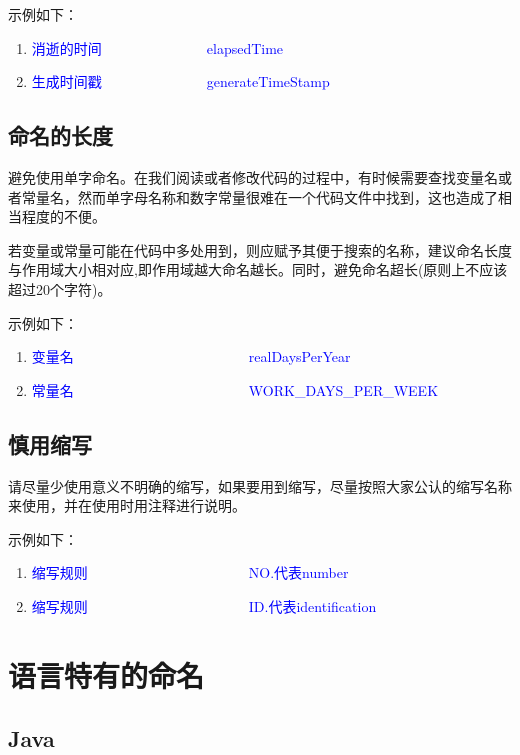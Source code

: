 示例如下：
\begin{enumerate}
\item  \textcolor{blue}{消逝的时间~~~~~~~~~~~~~~~elapsedTime}
\item  \textcolor{blue}{生成时间戳~~~~~~~~~~~~~~~generateTimeStamp}
\end{enumerate}

\subsection{命名的长度}
避免使用单字命名。在我们阅读或者修改代码的过程中，有时候需要查找变量名或者常量名，然而单字母名称和数字常量很难在一个代码文件中找到，这也造成了相当程度的不便。      

若变量或常量可能在代码中多处用到，则应赋予其便于搜索的名称，建议命名长度与作用域大小相对应,即作用域越大命名越长。同时，避免命名超长(原则上不应该超过20个字符)。

示例如下：
\begin{enumerate}
\item  \textcolor{blue}{变量名~~~~~~~~~~~~~~~~~~~~~~~~~realDaysPerYear}
\item  \textcolor{blue}{常量名~~~~~~~~~~~~~~~~~~~~~~~~~WORK\_DAYS\_PER\_WEEK}
\end{enumerate}

\subsection{慎用缩写}
请尽量少使用意义不明确的缩写，如果要用到缩写，尽量按照大家公认的缩写名称来使用，并在使用时用注释进行说明。

示例如下：
\begin{enumerate}
\item  \textcolor{blue}{缩写规则~~~~~~~~~~~~~~~~~~~~~~~NO.代表number}
\item  \textcolor{blue}{缩写规则~~~~~~~~~~~~~~~~~~~~~~~ID.代表identification}
\end{enumerate}

\section{语言特有的命名}

\subsection{Java}

